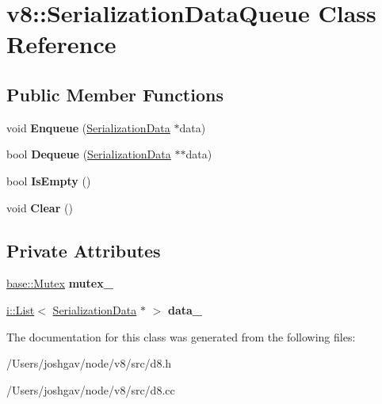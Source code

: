 \hypertarget{classv8_1_1_serialization_data_queue}{}\section{v8\+:\+:Serialization\+Data\+Queue Class Reference}
\label{classv8_1_1_serialization_data_queue}
\subsection*{Public Member Functions}
\begin{DoxyCompactItemize}
\item 
void {\bfseries Enqueue} (\hyperlink{classv8_1_1_serialization_data}{Serialization\+Data} $\ast$data)\hypertarget{classv8_1_1_serialization_data_queue_aee5e2d01a5a7d7a89a1b999aa528932c}{}\label{classv8_1_1_serialization_data_queue_aee5e2d01a5a7d7a89a1b999aa528932c}

\item 
bool {\bfseries Dequeue} (\hyperlink{classv8_1_1_serialization_data}{Serialization\+Data} $\ast$$\ast$data)\hypertarget{classv8_1_1_serialization_data_queue_ab74172e3a800b95bd454e53676e32dcc}{}\label{classv8_1_1_serialization_data_queue_ab74172e3a800b95bd454e53676e32dcc}

\item 
bool {\bfseries Is\+Empty} ()\hypertarget{classv8_1_1_serialization_data_queue_a9103ef577bcfe534f12347a6c8480062}{}\label{classv8_1_1_serialization_data_queue_a9103ef577bcfe534f12347a6c8480062}

\item 
void {\bfseries Clear} ()\hypertarget{classv8_1_1_serialization_data_queue_ab01f3774e08176cfb4d1dddfda6d04a4}{}\label{classv8_1_1_serialization_data_queue_ab01f3774e08176cfb4d1dddfda6d04a4}

\end{DoxyCompactItemize}
\subsection*{Private Attributes}
\begin{DoxyCompactItemize}
\item 
\hyperlink{classv8_1_1base_1_1_mutex}{base\+::\+Mutex} {\bfseries mutex\+\_\+}\hypertarget{classv8_1_1_serialization_data_queue_a035630fcfb8c2c756ae319ac5aab170c}{}\label{classv8_1_1_serialization_data_queue_a035630fcfb8c2c756ae319ac5aab170c}

\item 
\hyperlink{classv8_1_1internal_1_1_list}{i\+::\+List}$<$ \hyperlink{classv8_1_1_serialization_data}{Serialization\+Data} $\ast$ $>$ {\bfseries data\+\_\+}\hypertarget{classv8_1_1_serialization_data_queue_ace7d8c940aca55f02d54773a9005ec2c}{}\label{classv8_1_1_serialization_data_queue_ace7d8c940aca55f02d54773a9005ec2c}

\end{DoxyCompactItemize}


The documentation for this class was generated from the following files\+:\begin{DoxyCompactItemize}
\item 
/\+Users/joshgav/node/v8/src/d8.\+h\item 
/\+Users/joshgav/node/v8/src/d8.\+cc\end{DoxyCompactItemize}
